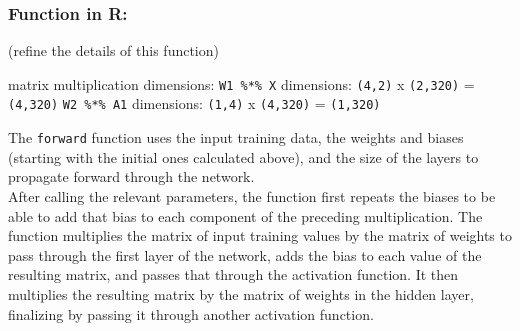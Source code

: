 \documentclass[
]{article}
\begin{document}
\hypertarget{function-in-r-2}{%
\subsubsection{Function in R:}\label{function-in-r-2}}

(refine the details of this function)

matrix multiplication dimensions: \texttt{W1\ \%*\%\ X} dimensions:
\texttt{(4,2)} x \texttt{(2,320)} = \texttt{(4,320)}
\texttt{W2\ \%*\%\ A1} dimensions: \texttt{(1,4)} x \texttt{(4,320)} =
\texttt{(1,320)}

The \texttt{forward} function uses the input training data, the weights
and biases (starting with the initial ones calculated above), and the
size of the layers to propagate forward through the network.\\
After calling the relevant parameters, the function first repeats the
biases to be able to add that bias to each component of the preceding
multiplication. The function multiplies the matrix of input training
values by the matrix of weights to pass through the first layer of the
network, adds the bias to each value of the resulting matrix, and passes
that through the activation function. It then multiplies the resulting
matrix by the matrix of weights in the hidden layer, finalizing by
passing it through another activation function.
\end{document}
